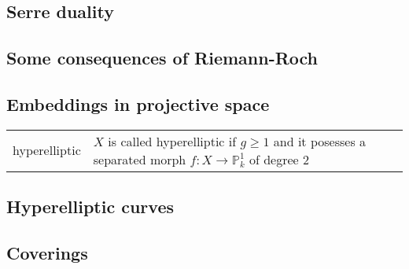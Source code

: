 \documentclass[a4paper, 12pt]{article}
\begin{document}
\subsection{Serre duality}

\subsection{Some consequences of Riemann-Roch}

\subsection{Embeddings in projective space}


\begin{longtable}{p{}  p{} }
	
	hyperelliptic & $X$ is called hyperelliptic if $g \geq 1$ and it posesses a separated morph $f:X \longrightarrow \mathbb{P}^1_k $ of degree 2
\end{longtable}



\subsection{Hyperelliptic curves}

\subsection{Coverings}

\begin{longtable}{p{}  p{} }
	
	
\end{longtable}




\begin{longtable}{p{}  p{} }
	
	
\end{longtable}
\end{document}

